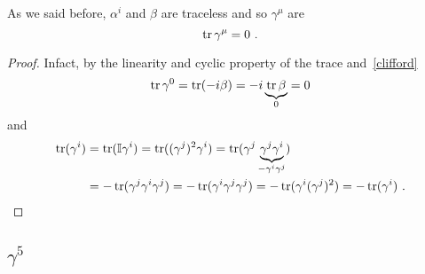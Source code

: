     As we said before, $\alpha^i$ and $\beta$ are traceless and so $\gamma^\mu$ are
    \begin{equation*}
        \operatorname{tr} \gamma^\mu = 0 ~.
    \end{equation*}
    \begin{proof}
        Infact, by the linearity and cyclic property of the trace and~\eqref{clifford}
        \begin{equation*}
            \operatorname{tr} \gamma^0 = \operatorname{tr} (- i \beta) = - i \underbrace{\operatorname{tr} \beta}_0 = 0
        \end{equation*}
        and 
        \begin{equation*}
        \begin{aligned}
            \operatorname{tr} (\gamma^i) & = \operatorname{tr} (\mathbb I \gamma^i) = \operatorname{tr} ((\gamma^j)^2 \gamma^i) = \operatorname{tr} (\gamma^j \underbrace{\gamma^j \gamma^i}_{- \gamma^i \gamma^j}) \\ & = - \operatorname{tr} (\gamma^j \gamma^i \gamma^j) = - \operatorname{tr} (\gamma^i \gamma^j \gamma^j) = - \operatorname{tr} (\gamma^i (\gamma^j)^2) = - \operatorname{tr} (\gamma^i) ~.
        \end{aligned}
        \end{equation*}
    \end{proof}

\subsection{$\gamma^5$}

